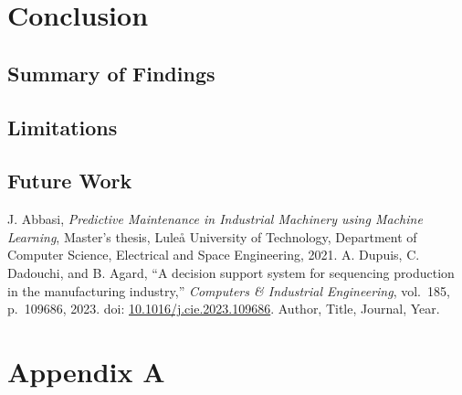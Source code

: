 \documentclass[12pt,a4paper]{report}
\begin{document}
\chapter{Conclusion}
\section{Summary of Findings}
\section{Limitations}
\section{Future Work}

\begin{thebibliography}{99}
J. Abbasi, \textit{Predictive Maintenance in Industrial Machinery using Machine Learning}, 
Master’s thesis, Luleå University of Technology, Department of Computer Science, Electrical and Space Engineering, 2021.
A. Dupuis, C. Dadouchi, and B. Agard, 
``A decision support system for sequencing production in the manufacturing industry,'' 
\textit{Computers \& Industrial Engineering}, vol.~185, p.~109686, 2023. 
doi: \href{https://doi.org/10.1016/j.cie.2023.109686}{10.1016/j.cie.2023.109686}.
 Author, Title, Journal, Year.

\end{thebibliography}

\appendix
\chapter{Appendix A}
\lipsum[2] 
\end{document}
